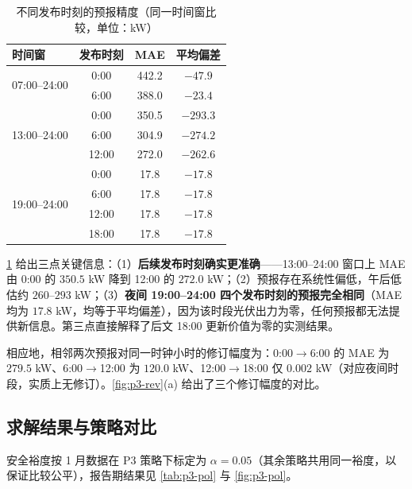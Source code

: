 \begin{table}[H]
  \centering
  \caption{不同发布时刻的预报精度（同一时间窗比较，单位：\si{kW}）}
  \label{tab:fc-acc}
  \small
  \begin{tabular}{lccc}
    \toprule[1.5pt]
    时间窗 & 发布时刻 & MAE & 平均偏差 \\
    \midrule[1pt]
    \multirow{2}{*}{07:00--24:00} & 0:00 & 442.2 & $-47.9$ \\
                                  & 6:00 & 388.0 & $-23.4$ \\
    \midrule[1pt]
    \multirow{3}{*}{13:00--24:00} & 0:00 & 350.5 & $-293.3$ \\
                                  & 6:00 & 304.9 & $-274.2$ \\
                                  & 12:00 & 272.0 & $-262.6$ \\
    \midrule[1pt]
    \multirow{4}{*}{19:00--24:00} & 0:00 & 17.8 & $-17.8$ \\
                                  & 6:00 & 17.8 & $-17.8$ \\
                                  & 12:00 & 17.8 & $-17.8$ \\
                                  & 18:00 & 17.8 & $-17.8$ \\
    \bottomrule[1.5pt]
  \end{tabular}
\end{table}

\cref{tab:fc-acc} 给出三点关键信息：（1）\textbf{后续发布时刻确实更准确}——13:00--24:00 窗口上 MAE 由 0:00 的 $350.5$ \si{kW} 降到 12:00 的 $272.0$ \si{kW}；（2）预报存在系统性偏低，午后低估约 $260$--$293$ \si{kW}；（3）\textbf{夜间 19:00--24:00 四个发布时刻的预报完全相同}（MAE 均为 $17.8$ \si{kW}，均等于平均偏差），因为该时段光伏出力为零，任何预报都无法提供新信息。第三点直接解释了后文 18:00 更新价值为零的实测结果。

相应地，相邻两次预报对同一时钟小时的修订幅度为：0:00$\to$6:00 的 MAE 为 $279.5$ \si{kW}、6:00$\to$12:00 为 $120.0$ \si{kW}、12:00$\to$18:00 仅 $0.002$ \si{kW}（对应夜间时段，实质上无修订）。\cref{fig:p3-rev}(a) 给出了三个修订幅度的对比。

\subsection{求解结果与策略对比}

安全裕度按 1 月数据在 P3 策略下标定为 $\alpha=0.05$（其余策略共用同一裕度，以保证比较公平），报告期结果见 \cref{tab:p3-pol} 与 \cref{fig:p3-pol}。

